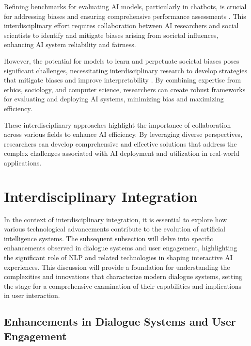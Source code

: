 Refining benchmarks for evaluating AI models, particularly in chatbots, is crucial for addressing biases and ensuring comprehensive performance assessments \cite{JudgingLLM2}. This interdisciplinary effort requires collaboration between AI researchers and social scientists to identify and mitigate biases arising from societal influences, enhancing AI system reliability and fairness.

However, the potential for models to learn and perpetuate societal biases poses significant challenges, necessitating interdisciplinary research to develop strategies that mitigate biases and improve interpretability \cite{nimase2024morecontextshelpsarcasm}. By combining expertise from ethics, sociology, and computer science, researchers can create robust frameworks for evaluating and deploying AI systems, minimizing bias and maximizing efficiency.

These interdisciplinary approaches highlight the importance of collaboration across various fields to enhance AI efficiency. By leveraging diverse perspectives, researchers can develop comprehensive and effective solutions that address the complex challenges associated with AI deployment and utilization in real-world applications.









\section{Interdisciplinary Integration} \label{sec:Interdisciplinary Integration}

In the context of interdisciplinary integration, it is essential to explore how various technological advancements contribute to the evolution of artificial intelligence systems. The subsequent subsection will delve into specific enhancements observed in dialogue systems and user engagement, highlighting the significant role of NLP and related technologies in shaping interactive AI experiences. This discussion will provide a foundation for understanding the complexities and innovations that characterize modern dialogue systems, setting the stage for a comprehensive examination of their capabilities and implications in user interaction.






\subsection{Enhancements in Dialogue Systems and User Engagement} \label{subsec:Enhancements in Dialogue Systems and User Engagement}

